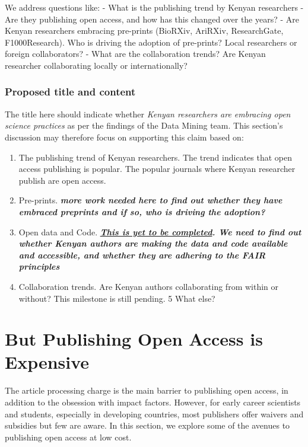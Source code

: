 We address questions like: - What is the publishing trend by Kenyan
researchers - Are they publishing open access, and how has this changed
over the years? - Are Kenyan researchers embracing pre-prints (BioRXiv,
AriRXiv, ResearchGate, F1000Research). Who is driving the adoption of
pre-prints? Local researchers or foreign collaborators? - What are the
collaboration trends? Are Kenyan researcher collaborating locally or
internationally?

\subsubsection{Proposed title and
content}\label{proposed-title-and-content}

The title here should indicate whether \emph{Kenyan researchers are
embracing open science practices} as per the findings of the Data Mining
team. This section's discussion may therefore focus on supporting this
claim based on:

\begin{enumerate}
\def\labelenumi{\arabic{enumi}.}
\tightlist
\item
  The publishing trend of Kenyan researchers. The trend indicates that
  open access publishing is popular. The popular journals where Kenyan
  researcher publish are open access.
\item
  Pre-prints. \textbf{\emph{more work needed here to find out whether
  they have embraced preprints and if so, who is driving the adoption?}}
\item
  Open data and Code.
  \textbf{\emph{\href{https://github.com/BioinfoNet/Data-mining/issues/11}{This
  is yet to be completed}. We need to find out whether Kenyan authors
  are making the data and code available and accessible, and whether
  they are adhering to the FAIR principles}}
\item
  Collaboration trends. Are Kenyan authors collaborating from within or
  without? This milestone is still pending. 5 What else?
\end{enumerate}

\section*{But Publishing Open Access is
Expensive}\label{but-publishing-open-access-is-expensive}

The article processing charge is the main barrier to publishing open
access, in addition to the obsession with impact factors. However, for
early career scientists and students, especially in developing
countries, most publishers offer waivers and subsidies but few are
aware. In this section, we explore some of the avenues to publishing
open access at low cost.

